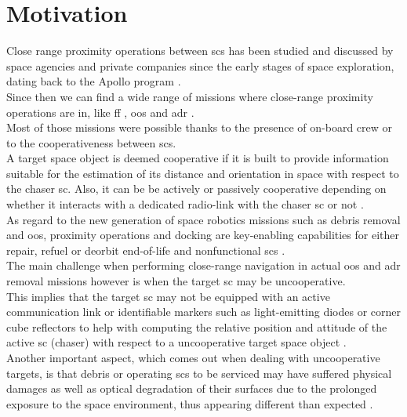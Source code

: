 \section{Motivation}
Close range proximity operations between \acrfull{sc}s has been studied and discussed by space agencies and private companies since the early stages of space exploration, dating back to the Apollo program \cite{LangleyApollo}.\\
Since then we can find a wide range of missions where close-range proximity operations are in, like \acrfull{ff} \cite{2001FormationFliying}  \cite{2009FormationFliying}, \acrfull{oos} \cite{auricchio} \cite{Zimpfer2005} \cite{Tatsch2006} \cite{FloresAbad2014} and \acrfull{adr} \cite{clerc2012astrium} \cite{Bonnal2013}.\\
Most of those missions were possible thanks to the presence of on-board crew or to the cooperativeness between \acrshort{sc}s.\\
A target space object is deemed cooperative if it is built to provide information suitable for the estimation of its distance and orientation in space with respect to the chaser \acrshort{sc}. Also, it can be be actively or passively cooperative depending on whether it interacts with a dedicated radio-link with the chaser \acrshort{sc} or not \cite{Opromolla2017}.\\
As regard to the new generation of space robotics missions such as debris removal and \acrshort{oos}, proximity operations and docking are key-enabling capabilities for either repair, refuel or deorbit end-of-life and nonfunctional \acrshort{sc}s \cite{2016Ventura}.\\
The main challenge when performing close-range navigation in actual \acrshort{oos} and \acrshort{adr} removal missions however is when the target \acrshort{sc} may be uncooperative.\\
This implies that the target \acrshort{sc} may not be equipped with an active communication link or identifiable markers such as light-emitting diodes or corner cube reflectors to help with computing the relative position and attitude of the active \acrshort{sc} (chaser) with respect to a uncooperative target space object \cite{2019phdSharma}.\\
Another important aspect, which comes out when dealing with uncooperative targets, is that debris or operating \acrshort{sc}s to be serviced may have suffered physical damages as well as optical degradation of their surfaces due to the prolonged exposure to the space environment, thus appearing different than expected \cite{Opromolla2017}.\\
